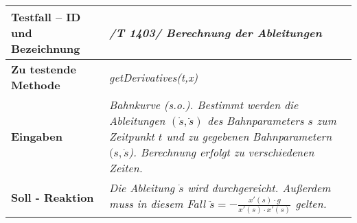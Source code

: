 \begin{longtable}{|p{7cm}|p{10cm}|}
\hline
\textbf{Testfall -- ID und Bezeichnung} & \textit{ /T 1403/ Berechnung der Ableitungen} \\
\hline
\textbf{Zu testende Methode} &  \textit{getDerivatives(t,x)} \\
\hline
\textbf{Eingaben} & \textit{Bahnkurve (s.o.). Bestimmt werden die Ableitungen $(\dot s, \ddot s)$
des Bahnparameters $s$ zum Zeitpunkt $t$ und zu gegebenen Bahnparametern $(s, \dot s$). Berechnung
erfolgt zu verschiedenen Zeiten. }\\
\hline
\textbf{Soll - Reaktion} & \textit{Die Ableitung $\dot s$ wird durchgereicht. 
Außerdem muss in diesem Fall 
$\ddot s = - \frac{x'(s) \cdot g}{x'(s) \cdot x'(s)}$ gelten.} \\
\hline
\end{longtable}
